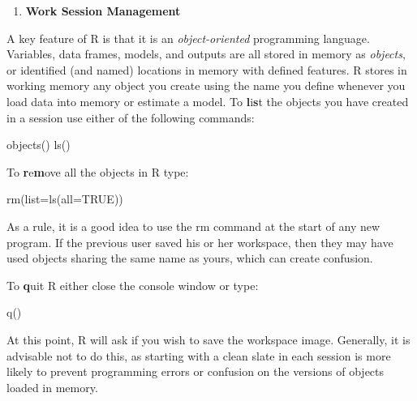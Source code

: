 \documentclass[
]{book}
\newenvironment{Shaded}{\begin{snugshade}}{\end{snugshade}}
\newcommand{\AttributeTok}[1]{\textcolor[rgb]{0.77,0.63,0.00}{#1}}
\newcommand{\ConstantTok}[1]{\textcolor[rgb]{0.00,0.00,0.00}{#1}}
\newcommand{\FunctionTok}[1]{\textcolor[rgb]{0.00,0.00,0.00}{#1}}
\newcommand{\NormalTok}[1]{#1}
\providecommand{\tightlist}{%
  \setlength{\itemsep}{0pt}\setlength{\parskip}{0pt}}
\begin{document}
\begin{enumerate}
\def\labelenumi{\arabic{enumi}.}
\setcounter{enumi}{3}
\tightlist
\item
  \textbf{Work Session Management}
\end{enumerate}

A key feature of R is that it is an \emph{object-oriented} programming language. Variables, data frames, models, and outputs are all stored in memory as \emph{objects}, or identified (and named) locations in memory with defined features. R stores in working memory any object you create using the name you define whenever you load data into memory or estimate a model. To \textbf{l}i\textbf{s}t the objects you have created in a session use either of the following commands:

\begin{Shaded}
\begin{Highlighting}[]
\FunctionTok{objects}\NormalTok{() }
\FunctionTok{ls}\NormalTok{()}
\end{Highlighting}
\end{Shaded}

To \textbf{r}e\textbf{m}ove all the objects in R type:

\begin{Shaded}
\begin{Highlighting}[]
\FunctionTok{rm}\NormalTok{(}\AttributeTok{list=}\FunctionTok{ls}\NormalTok{(}\AttributeTok{all=}\ConstantTok{TRUE}\NormalTok{))}
\end{Highlighting}
\end{Shaded}

As a rule, it is a good idea to use the rm command at the start of any new program. If the previous user saved his or her workspace, then they may have used objects sharing the same name as yours, which can create confusion.

To \textbf{q}uit R either close the console window or type:

\begin{Shaded}
\begin{Highlighting}[]
\FunctionTok{q}\NormalTok{()}
\end{Highlighting}
\end{Shaded}

At this point, R will ask if you wish to save the workspace image. Generally, it is advisable not to do this, as starting with a clean slate in each session is more likely to prevent programming errors or confusion on the versions of objects loaded in memory.
\end{document}
